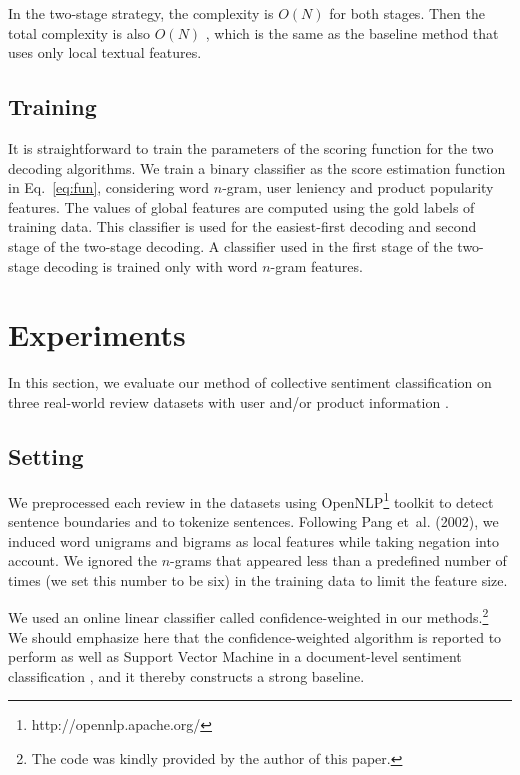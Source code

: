 \documentclass[english]{jnlp_1.4}
\begin{document}
In the two-stage strategy, the complexity is $O(N)$ for both stages. 
Then the total complexity is also $O(N)$ , which is the same as the baseline method that uses only local textual features.
 

\subsection{Training}

It is straightforward to train the parameters of the scoring function for the two decoding algorithms. 
We train a binary classifier as the score estimation function in Eq.~\ref{eq:fun}, considering word $n$-gram, user leniency and product popularity features. 
The values of global features are computed using the gold labels of training data.
This classifier is used for the easiest-first decoding and second stage of the two-stage decoding.
A classifier used in the first stage of the two-stage decoding is trained only with word $n$-gram features.


\section{Experiments}
\label{sec:exp}

In this section, we evaluate our method of collective sentiment classification on three real-world review datasets with user and/or product information \cite{Pang:2004,Blitzer:2007,maas:2011}.  


\subsection{Setting}
\label{subsec:setting}

We preprocessed each review in the datasets using OpenNLP\footnote{http://opennlp.apache.org/} toolkit to detect sentence boundaries and to tokenize sentences. 
Following Pang et~al. (2002), we induced word unigrams and bigrams as local features while taking negation into account. 
We ignored the $n$-grams that appeared less than a predefined number of times (we set this number to be six) in the training data to limit the feature size.

We used an online linear classifier called  confidence-weighted \cite{Dredze:2008} in our methods.\footnote{The code was kindly provided by the author of this paper.}
We should emphasize here that the confidence-weighted algorithm is reported to perform as well as Support Vector Machine in a document-level sentiment classification \cite{Dredze:2008},  and it thereby constructs a strong baseline.
\end{document}
